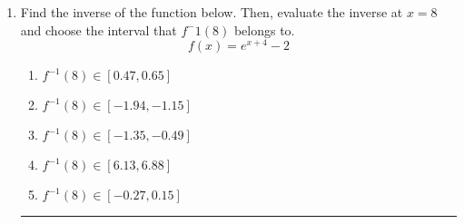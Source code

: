 \documentclass[14pt]{extbook}
\newcommand{\litem}[1]{\item#1\hspace*{-1cm}\rule{\textwidth}{0.4pt}}
\begin{document}
\begin{enumerate}
{\begin{enumerate}[label=\Alph*.]
\end{enumerate} }
\litem{
Find the inverse of the function below. Then, evaluate the inverse at $x = 8$ and choose the interval that $f^-1(8)$ belongs to.\[ f(x) = e^{x+4}-2 \]\begin{enumerate}[label=\Alph*.]
\item \( f^{-1}(8) \in [0.47, 0.65] \)
\item \( f^{-1}(8) \in [-1.94, -1.15] \)
\item \( f^{-1}(8) \in [-1.35, -0.49] \)
\item \( f^{-1}(8) \in [6.13, 6.88] \)
\item \( f^{-1}(8) \in [-0.27, 0.15] \)

\end{enumerate} }
\end{enumerate}
\end{document}
